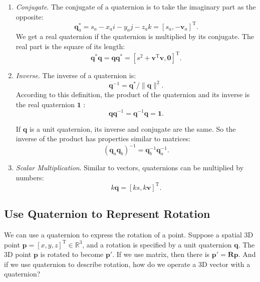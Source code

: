 \begin{enumerate}
    \item { \emph {Conjugate}}. The conjugate of a quaternion is to take the imaginary part as the opposite:
    \begin{equation}
    \mathbf{q}_a ^ * = s_a - x_ai - y_aj - z_ak = [s_a, - \mathbf{v}_a] ^ \mathrm{T}.
    \end{equation}
    We get a real quaternion if the quaternion is multiplied by its conjugate. The real part is the square of its length:
    \begin{equation}
    \mathbf{q}^* \mathbf{q} = \mathbf{q} \mathbf{q}^* = [s^2+\mathbf{v}^\mathrm{T} \mathbf{v}, \mathbf{0} ]^\mathrm{T}.
    \end{equation}
    
    \item { \emph{Inverse}}. The inverse of a quaternion is:
    \begin{equation}
    \label{eq:quaternionInverse}
    \mathbf{q} ^ { - 1 } = \mathbf{q} ^ * / \| \mathbf{q} \| ^ 2.
    \end{equation}
    According to this definition, the product of the quaternion and its inverse is the real quaternion $ \mathbf {1} $ :
    \begin{equation}
    \mathbf{q} \mathbf{q}^{-1} = \mathbf{q}^{-1} \mathbf{q} = \mathbf{1}.
    \end{equation}
    
    If $ \mathbf{q} $ is a unit quaternion, its inverse and conjugate are the same. So the inverse of the product has properties similar to matrices:
    \begin{equation}
    \left( \mathbf{q}_a \mathbf{q}_b \right)^{-1} = \mathbf{q}_b^{-1} \mathbf{q}_a^{-1}.
    \end{equation}
    
    \item { \emph {Scalar Multiplication}.} Similar to vectors, quaternions can be multiplied by numbers:
    \begin{equation}
    k \mathbf{q} = \left[ ks, k\mathbf{v} \right]^\mathrm{T}.
    \end{equation}
\end{enumerate}

\subsection{Use Quaternion to Represent Rotation}

We can use a quaternion to express the rotation of a point. Suppose a spatial 3D point $ \mathbf{p} = [x,y,z]^\mathrm{T} \in  \mathbb {R}^3$, and a rotation is specified by a unit quaternion $ \mathbf{q}$. The 3D point $\mathbf{p}$ is rotated to become $\mathbf{p}'$. If we use matrix, then there is $ \mathbf{p}'= \mathbf{R} \mathbf{p} $. And if we use quaternion to describe rotation, how do we operate a 3D vector with a quaternion?

